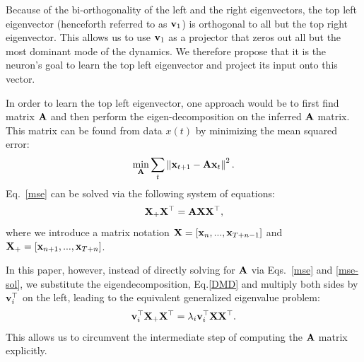 \documentclass[%
 reprint,
 amsmath,amssymb,
 aps,
]{revtex4-2}
\begin{document}
Because of the bi-orthogonality of the left and the right eigenvectors, the top left eigenvector (henceforth referred to as ${\bf v}_1$) is orthogonal to all but the top right eigenvector. This allows us to use ${\bf v}_1$ as a projector that zeros out all but the most dominant mode of the dynamics. We therefore propose that it is the neuron's goal to learn the top left eigenvector and project its input onto this vector.

In order to learn the top left eigenvector, one approach would be to first find matrix ${\bf A}$ and then perform the eigen-decomposition on the inferred ${\bf A}$ matrix. This matrix can be found from data $x(t)$ by minimizing the mean squared error:
\begin{equation}
\label{mse}
    \min_{{\bf A}}\sum_t\left\lVert{\bf x}_{t+1}-{\bf A}{\bf x}_t\right\rVert^2.
\end{equation}
Eq.~\eqref{mse} can be solved via the following system of equations:
\begin{equation}
\label{mse-sol}
  {\bf X}_+{\bf X}^\top = {\bf A}{\bf X}{\bf X}^\top,
\end{equation}
where we introduce a matrix notation ${\bf X}=[{\bf x}_n,...,{\bf x}_{T+n-1}]$ and ${\bf X}_+=[{\bf x}_{n+1},...,{\bf x}_{T+n}]$.

In this paper, however, instead of directly solving for ${\bf A}$ via Eqs.~\eqref{mse} and \eqref{mse-sol}, we substitute the eigendecomposition, Eq.\eqref{DMD} and multiply both sides by ${\bf v}_i^\top$ on the left, leading to the equivalent generalized eigenvalue problem:
\begin{equation}\label{eq:gen_eig_prob}
  {\bf v}_i^\top {\bf X}_+{\bf X}^\top = \lambda_i{\bf v}_i^\top{\bf X}{\bf X}^\top.
\end{equation}
This allows us to circumvent the intermediate step of computing the ${\bf A}$ matrix explicitly.




\end{document}

